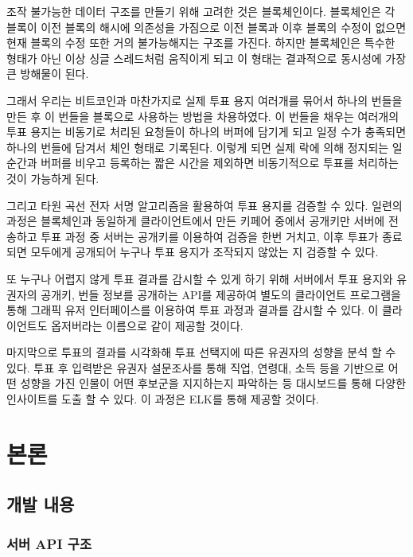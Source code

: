 \documentclass[8pt,a4paper,left=8mm,right=8mm,top=10mm,bottom=10mm]{article}
\begin{document}
조작 불가능한 데이터 구조를 만들기 위해 고려한 것은 블록체인이다. 블록체인은 각 블록이 이전 블록의 해시에 의존성을 가짐으로 이전 블록과 이후 블록의 수정이 없으면 현재 블록의 수정 또한 거의 불가능해지는 구조를 가진다. 하지만 블록체인은 특수한 형태가 아닌 이상 싱글 스레드처럼 움직이게 되고 이 형태는 결과적으로 동시성에 가장 큰 방해물이 된다.

그래서 우리는 비트코인과 마찬가지로 실제 투표 용지 여러개를 묶어서 하나의 번들을 만든 후 이 번들을 블록으로 사용하는 방법을 차용하였다. 이 번들을 채우는 여러개의 투표 용지는 비동기로 처리된 요청들이 하나의 버퍼에 담기게 되고 일정 수가 충족되면 하나의 번들에 담겨서 체인 형태로 기록된다. 이렇게 되면 실제 락에 의해 정지되는 일순간과 버퍼를 비우고 등록하는 짧은 시간을 제외하면 비동기적으로 투표를 처리하는 것이 가능하게 된다.

그리고 타원 곡선 전자 서명 알고리즘을 활용하여 투표 용지를 검증할 수 있다. 일련의 과정은 블록체인과 동일하게 클라이언트에서 만든 키페어 중에서 공개키만 서버에 전송하고 투표 과정 중 서버는 공개키를 이용하여 검증을 한번 거치고, 이후 투표가 종료되면 모두에게 공개되어 누구나 투표 용지가 조작되지 않았는 지 검증할 수 있다.

또 누구나 어렵지 않게 투표 결과를 감시할 수 있게 하기 위해 서버에서 투표 용지와 유권자의 공개키, 번들 정보를 공개하는 API를 제공하여 별도의 클라이언트 프로그램을 통해 그래픽 유저 인터페이스를 이용하여 투표 과정과 결과를 감시할 수 있다. 이 클라이언트도 옵저버라는 이름으로 같이 제공할 것이다.

마지막으로 투표의 결과를 시각화해 투표 선택지에 따른 유권자의 성향을 분석 할 수 있다. 투표 후 입력받은 유권자 설문조사를 통해 직업, 연령대, 소득 등을 기반으로 어떤 성향을 가진 인물이 어떤 후보군을 지지하는지 파악하는 등 대시보드를 통해 다양한 인사이트를 도출 할 수 있다. 이 과정은 ELK를 통해 제공할 것이다.

\section{본론}

\subsection{개발 내용}

\subsubsection{서버 API 구조}
\end{document}
